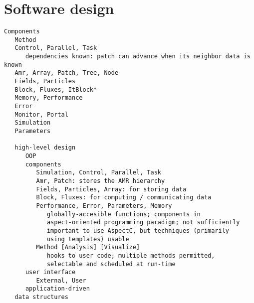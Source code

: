 \documentclass[14pt,letter]{article}
\begin{document}
\section{Software design} \label{s:design}

\begin{verbatim}
Components
   Method
   Control, Parallel, Task
      dependencies known: patch can advance when its neighbor data is known
   Amr, Array, Patch, Tree, Node 
   Fields, Particles
   Block, Fluxes, ItBlock*
   Memory, Performance
   Error
   Monitor, Portal
   Simulation
   Parameters

   high-level design
      OOP
      components
         Simulation, Control, Parallel, Task
         Amr, Patch: stores the AMR hierarchy
         Fields, Particles, Array: for storing data
         Block, Fluxes: for computing / communicating data
         Performance, Error, Parameters, Memory
            globally-accesible functions; components in
            aspect-oriented programming paradigm; not sufficiently
            important to use AspectC, but techniques (primarily
            using templates) usable
         Method [Analysis] [Visualize]
            hooks to user code; multiple methods permitted,
            selectable and scheduled at run-time
      user interface
         External, User
      application-driven
   data structures
\end{verbatim}
\end{document}

